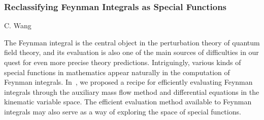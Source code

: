 \documentclass{FBR_Bericht_2025}
\begin{document}
\begin{refsection}
\subsubsection{Reclassifying Feynman Integrals as Special Functions}
\begin{Namen}
C. Wang
\end{Namen}
%
The Feynman integral is the central object in the perturbation theory of quantum field theory, and its evaluation is also one of the main sources of difficulties in our quest for even more precise theory predictions.
Intriguingly, various kinds of special functions in mathematics appear naturally in the computation of Feynman integrals.
In~\cite{Liu:2023jkr}, we proposed a recipe for efficiently evaluating Feynman integrals through the auxiliary mass flow method and differential equations in the kinematic variable space.
The efficient evaluation method available to Feynman integrals may also serve as a way of exploring the space of special functions.
%
%

\end{refsection}
\end{document}

